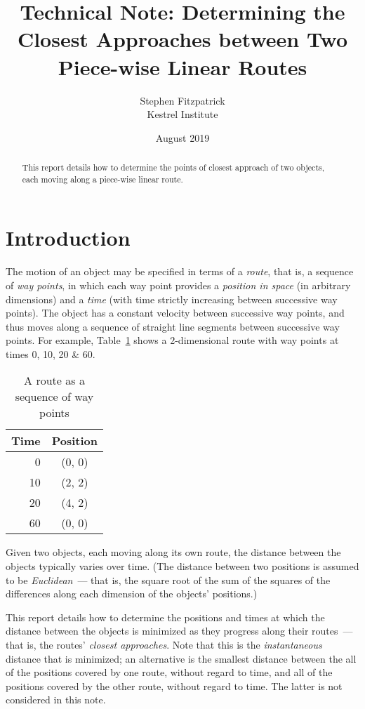 \documentclass[times,12pt]{article}
\title{Technical Note: Determining the Closest Approaches between Two Piece-wise Linear Routes}
\author{Stephen Fitzpatrick\\{\normalsize Kestrel Institute}}
\date{August 2019}
\begin{document}
\maketitle

\begin{abstract}
	This report details how to determine the points of closest approach of two objects, each moving along a piece-wise linear route.
\end{abstract}

\section{Introduction}
The motion of an object may be specified in terms of a \textit{route}, that is, a sequence of \textit{way points}, in which each way point provides a \emph{position in space} (in arbitrary dimensions) and a \emph{time} (with time strictly increasing between successive way points). The object has a constant velocity between successive way points, and thus moves along a sequence of straight line segments between successive way points. For example, Table~\ref{fig:a-route} shows a 2-dimensional route with way points at times 0, 10, 20 \& 60.

\begin{table}[htbp]
	\centering
	\begin{tabular}[t]{|r|c|} \hline
		Time & Position \\ \hline
		0 & (0, 0) \\ \hline
		10 & (2, 2) \\ \hline
		20 & (4, 2) \\ \hline
		60 & (0, 0) \\ \hline
	\end{tabular}
\caption{A route as a sequence of way points}
\label{fig:a-route}
\end{table}

Given two objects, each moving along its own route, the distance between the objects typically varies over time. (The distance between two positions is assumed to be \textit{Euclidean}~--- that is, the square root of the sum of the squares of the differences along each dimension of the objects' positions.)

This report details how to determine the positions and times at which the distance between the objects is minimized as they progress along their routes~--- that is, the routes' \textit{closest approaches}. Note that this is the \emph{instantaneous} distance that is minimized; an alternative is the smallest distance between the all of the positions covered by one route, without regard to time, and all of the positions covered by the other route, without regard to time. The latter is not considered in this note.
\end{document}
